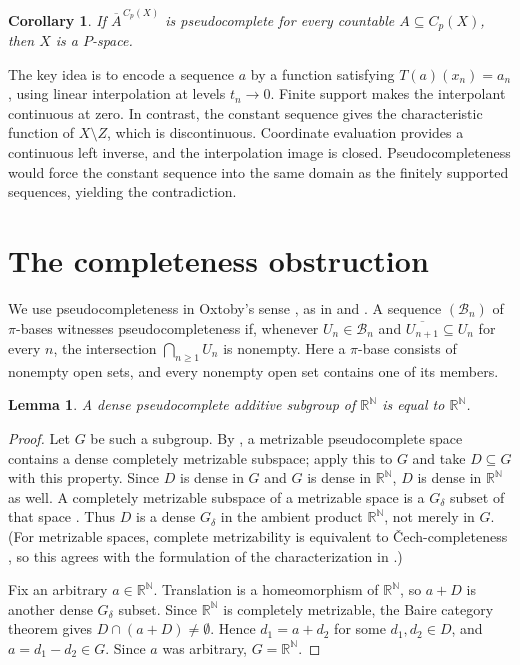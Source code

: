 \documentclass{amsart}
\newtheorem{lemma}[theorem]{Lemma}
\newtheorem{corollary}[theorem]{Corollary}
\theoremstyle{remark}
\newcommand{\R}{\mathbb{R}}
\newcommand{\N}{\mathbb{N}}
\begin{document}
\begin{corollary}\label{cor:main}
If $\overline{A}^{\,C_p(X)}$ is pseudocomplete for every countable $A\subseteq C_p(X)$, then $X$ is a $P$-space.
\end{corollary}

The key idea is to encode a sequence $a$ by a function satisfying $T(a)(x_n)=a_n$, using linear interpolation at levels $t_n\to 0$. Finite support makes the interpolant continuous at zero. In contrast, the constant sequence gives the characteristic function of $X\setminus Z$, which is discontinuous. Coordinate evaluation provides a continuous left inverse, and the interpolation image is closed. Pseudocompleteness would force the constant sequence into the same domain as the finitely supported sequences, yielding the contradiction.

\section{The completeness obstruction}

We use pseudocompleteness in Oxtoby's sense \cite{O}, as in \cite[Section~2.1]{AL} and \cite[Section~2]{DT}. A sequence $(\mathcal{B}_n)$ of $\pi$-bases witnesses pseudocompleteness if, whenever $U_n\in\mathcal{B}_n$ and $\overline{U_{n+1}}\subseteq U_n$ for every $n$, the intersection $\bigcap_{n\geq 1} U_n$ is nonempty. Here a $\pi$-base consists of nonempty open sets, and every nonempty open set contains one of its members.

\begin{lemma}\label{lem:subgroup}
A dense pseudocomplete additive subgroup of $\R^{\N}$ is equal to $\R^{\N}$.
\end{lemma}

\begin{proof}
Let $G$ be such a subgroup. By \cite[Section~2.4, Corollary, p.~4]{AL}, a metrizable pseudocomplete space contains a dense completely metrizable subspace; apply this to $G$ and take $D\subseteq G$ with this property. Since $D$ is dense in $G$ and $G$ is dense in $\R^{\N}$, $D$ is dense in $\R^{\N}$ as well. A completely metrizable subspace of a metrizable space is a $G_\delta$ subset of that space \cite[Theorem~4.3.24]{E}. Thus $D$ is a dense $G_\delta$ in the ambient product $\R^{\N}$, not merely in $G$. (For metrizable spaces, complete metrizability is equivalent to \v{C}ech-completeness \cite[Theorem~4.3.26]{E}, so this agrees with the formulation of the characterization in \cite[Section~2]{DT}.)

Fix an arbitrary $a\in\R^{\N}$. Translation is a homeomorphism of $\R^{\N}$, so $a+D$ is another dense $G_\delta$ subset. Since $\R^{\N}$ is completely metrizable, the Baire category theorem gives $D\cap(a+D)\neq\emptyset$. Hence $d_1=a+d_2$ for some $d_1,d_2\in D$, and $a=d_1-d_2\in G$. Since $a$ was arbitrary, $G=\R^{\N}$.
\end{proof}
\end{document}

